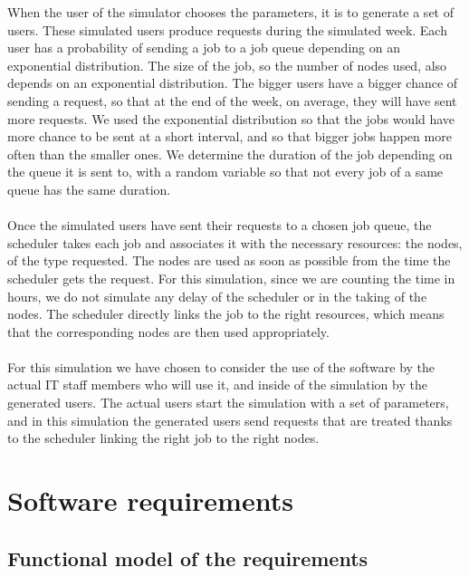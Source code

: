 \documentclass [10 pt, a4 paper]{report}
\begin{document}
\noindent
When the user of the simulator chooses the parameters, it is to generate a set of users. These simulated users produce requests during the simulated week. Each user has a probability of sending a job to a job queue depending on an exponential distribution. The size of the job, so the number of nodes used, also depends on an exponential distribution. The bigger users have a bigger chance of sending a request, so that at the end of the week, on average, they will have sent more requests. We used the exponential distribution so that the jobs would have more chance to be sent at a short interval, and so that bigger jobs happen more often than the smaller ones. We determine the duration of the job depending on the queue it is sent to, with a random variable so that not every job of a same queue has the same duration.
\\ \\
Once the simulated users have sent their requests to a chosen job queue, the scheduler takes each job and associates it with the necessary resources: the nodes, of the type requested. The nodes are used as soon as possible from the time the scheduler gets the request. For this simulation, since we are counting the time in hours, we do not simulate any delay of the scheduler or in the taking of the nodes. The scheduler directly links the job to the right resources, which means that the corresponding nodes are then used appropriately.
\\ \\
\clearpage
For this simulation we have chosen to consider the use of the software by the actual IT staff members who will use it, and inside of the simulation by the generated users. The actual users start the simulation with a set of parameters, and in this simulation the generated users send requests that are treated thanks to the scheduler linking the right job to the right nodes.




\chapter{Software requirements}

\section{Functional model of the requirements}
\end{document}
